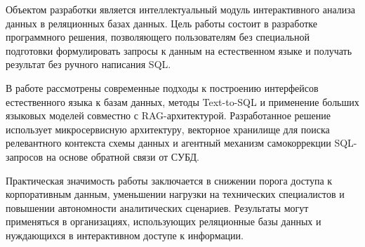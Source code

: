 \abstract


Объектом разработки является интеллектуальный модуль интерактивного анализа данных в реляционных базах данных. Цель работы состоит в разработке программного решения, позволяющего пользователям без специальной подготовки формулировать запросы к данным на естественном языке и получать результат без ручного написания SQL.

В работе рассмотрены современные подходы к построению интерфейсов естественного языка к базам данных, методы Text-to-SQL и применение больших языковых моделей совместно с RAG-архитектурой. Разработанное решение использует микросервисную архитектуру, векторное хранилище для поиска релевантного контекста схемы данных и агентный механизм самокоррекции SQL-запросов на основе обратной связи от СУБД.

Практическая значимость работы заключается в снижении порога доступа к корпоративным данным, уменьшении нагрузки на технических специалистов и повышении автономности аналитических сценариев. Результаты могут применяться в организациях, использующих реляционные базы данных и нуждающихся в интерактивном доступе к информации.
